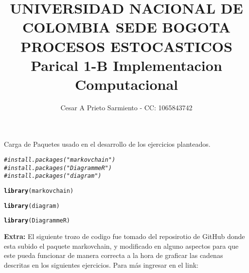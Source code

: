 \documentclass[11pt]{article}\usepackage[]{graphicx}\usepackage[table]{xcolor}
\title{UNIVERSIDAD NACIONAL DE COLOMBIA SEDE BOGOTA\\ PROCESOS ESTOCASTICOS \\Parical 1-B Implementacion Computacional}
\author{Cesar A Prieto Sarmiento - CC: 1065843742}
\makeatletter
\newcommand{\hlcom}[1]{\textcolor[rgb]{0.678,0.584,0.686}{\textit{#1}}}%
\newcommand{\hlstd}[1]{\textcolor[rgb]{0.345,0.345,0.345}{#1}}%
\newcommand{\hlkwd}[1]{\textcolor[rgb]{0.737,0.353,0.396}{\textbf{#1}}}%
\newenvironment{kframe}{%
 \def\at@end@of@kframe{}%
 \ifinner\ifhmode%
  \def\at@end@of@kframe{\end{minipage}}%
  \begin{minipage}{\columnwidth}%
 \fi\fi%
 \def\FrameCommand##1{\hskip\@totalleftmargin \hskip-\fboxsep
 \colorbox{shadecolor}{##1}\hskip-\fboxsep
     \hskip-\linewidth \hskip-\@totalleftmargin \hskip\columnwidth}%
 \MakeFramed {\advance\hsize-\width
   \@totalleftmargin\z@ \linewidth\hsize
   \@setminipage}}%
 {\par\unskip\endMakeFramed%
 \at@end@of@kframe}
\newenvironment{knitrout}{}{} %
\makeatother
\begin{document}
\maketitle

Carga de Paquetes usado en el desarrollo de los ejercicios planteados.

\begin{knitrout}
\color{fgcolor}\begin{kframe}
\begin{alltt}
\hlcom{#install.packages("markovchain")}
\hlcom{#install.packages("DiagrammeR")}
\hlcom{#install.packages("diagram")}

\hlkwd{library}\hlstd{(markovchain)}
\end{alltt}


{\ttfamily\noindent\color{warningcolor}{\#\# Warning: package 'markovchain' was built under R version 4.2.3}}

{\ttfamily\noindent\itshape\color{messagecolor}{\#\# Package: \ markovchain\\\#\# Version: \ 0.9.5\\\#\# Date: \ \ \ \ 2023-09-24 09:20:02 UTC\\\#\# BugReport: https://github.com/spedygiorgio/markovchain/issues}}\begin{alltt}
\hlkwd{library}\hlstd{(diagram)}
\end{alltt}


{\ttfamily\noindent\color{warningcolor}{\#\# Warning: package 'diagram' was built under R version 4.2.3}}

{\ttfamily\noindent\itshape\color{messagecolor}{\#\# Loading required package: shape}}

{\ttfamily\noindent\color{warningcolor}{\#\# Warning: package 'shape' was built under R version 4.2.3}}\begin{alltt}
\hlkwd{library}\hlstd{(DiagrammeR)}
\end{alltt}


{\ttfamily\noindent\color{warningcolor}{\#\# Warning: package 'DiagrammeR' was built under R version 4.2.3}}\end{kframe}
\end{knitrout}


\textbf{Extra:} El siguiente trozo de codigo fue tomado del reposirotio de GitHub donde esta subido el paquete markovchain, y modificado en alguno aspectos para que este pueda funcionar de manera correcta a la hora de graficar las cadenas descritas en los siguientes ejercicios. Para más ingresar en el link: 
\end{document}
